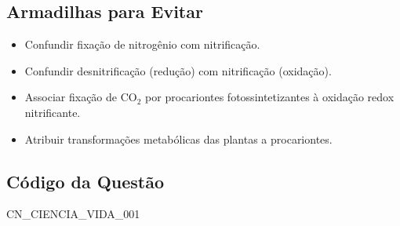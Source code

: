 \documentclass{article}
\begin{document}
\subsection*{Armadilhas para Evitar}
\begin{itemize}
  \item Confundir fixação de nitrogênio com nitrificação.
  \item Confundir desnitrificação (redução) com nitrificação (oxidação).
  \item Associar fixação de CO$_2$ por procariontes fotossintetizantes à oxidação redox nitrificante.
  \item Atribuir transformações metabólicas das plantas a procariontes.
\end{itemize}

\subsection*{Código da Questão}
CN\_CIENCIA\_VIDA\_001
\end{document}
